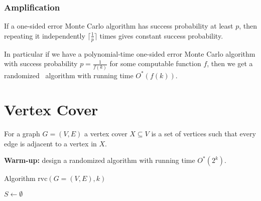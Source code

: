 \begin{frame}[c]\frametitle{Amplification}
    
    \begin{theorem}
        \label{thm:ampl}
        If a one-sided error Monte Carlo algorithm has success probability at least $p$, then repeating it independently $\lceil \frac{1}{p} \rceil$ times gives constant success probability.
    \end{theorem}

 In particular if we have a polynomial-time one-sided error Monte Carlo algorithm with success probability $p = \frac{1}{f(k)}$ for some computable function $f$, then we get a randomized \FPT\ algorithm with running time $O^*(f(k))$.

\end{frame}

\section{Vertex Cover}

\begin{frame}[c]
    
    For a graph $G = (V,E)$ a \alert{vertex cover} $X \subseteq V$ is a set of vertices such that every edge is adjacent to a vertex in $X$.
    

    \pause
    \noindent
    \textbf{Warm-up:} design a randomized algorithm with running time $O^*(2^k)$.

\end{frame}


\begin{frame}[c]
	
\begin{algorithm}[H]
	\DontPrintSemicolon
	\SetArgSty{}
	
	\alert{Algorithm $\text{rvc}(G=(V,E),k)$}\;
	\BlankLine
	
	$S \leftarrow \emptyset$\;
	\Else{
		\Return{\No}
	}
\end{algorithm}

\end{frame}

